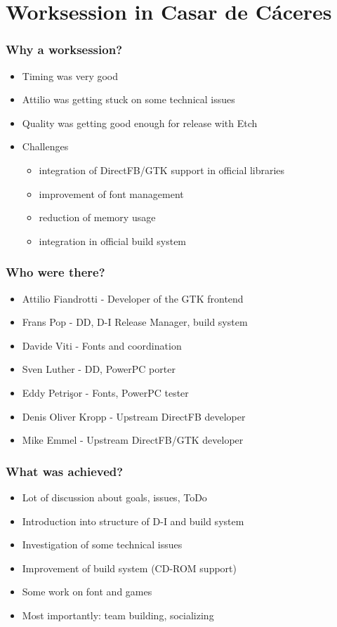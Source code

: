 \documentclass{beamer}
\begin{document}
\section{Worksession in Casar de C\'{a}ceres}

\begin{frame}
  \frametitle{Why a worksession?}
	\begin{itemize}
	\item
		Timing was very good
	\item
		Attilio was getting stuck on some technical issues
	\item
		Quality was getting good enough for release with Etch
	\item
		Challenges
		\begin{itemize}
		\item
			integration of DirectFB/GTK support in official libraries
		\item
			improvement of font management
		\item
			reduction of memory usage
		\item
			integration in official build system
		\end{itemize}
	\end{itemize}
\end{frame}

\begin{frame}
  \frametitle{Who were there?}
	\begin{itemize}
	\item
		Attilio Fiandrotti - Developer of the GTK frontend
	\item
		Frans Pop - DD, D-I Release Manager, build system
	\item
		Davide Viti - Fonts and coordination
	\item
		Sven Luther - DD, PowerPC porter
	\item
		Eddy Petrişor - Fonts, PowerPC tester
	\end{itemize}
	\begin{itemize}
	\item
		Denis Oliver Kropp - Upstream DirectFB developer
	\item
		Mike Emmel - Upstream DirectFB/GTK developer
	\end{itemize}
\end{frame}

\begin{frame}
  \frametitle{What was achieved?}
	\begin{itemize}
	\item
		Lot of discussion about goals, issues, ToDo
	\item
		Introduction into structure of D-I and build system
	\item
		Investigation of some technical issues
	\item
		Improvement of build system (CD-ROM support)
	\item
		Some work on font and games
	\item
		Most importantly: team building, socializing
	\end{itemize}
\end{frame}
\end{document}
